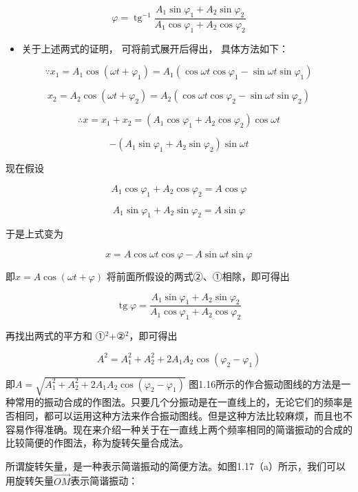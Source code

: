 \[
\varphi = \operatorname{tg} ^ {- 1} \frac {A _ {1} \sin \varphi_ {1} + A _ {2} \sin \varphi_ {2}}{A _ {1} \cos \varphi_ {1} + A _ {2} \cos \varphi_ {2}} \tag {1.27}
\]

\begin{itemize}
\tightlist
\item
  关于上述两式的证明， 可将前式展开后得出， 具体方法如下：
\end{itemize}

\[
\because x _ {1} = A _ {1} \cos (\omega t + \varphi_ {1}) = A _ {1} (\cos \omega t \cos \varphi_ {1} - \sin \omega t \sin \varphi_ {1})
\]

\[
x _ {2} = A _ {2} \cos (\omega t + \varphi_ {2}) = A _ {2} (\cos \omega t \cos \varphi_ {2} - \sin \omega t \sin \varphi_ {2})
\]

\[
\therefore x = x _ {1} + x _ {2} = (A _ {1} \cos \varphi_ {1} + A _ {2} \cos \varphi_ {2}) \cos \omega t
\]

\[
- \left(A _ {1} \sin \varphi_ {1} + A _ {2} \sin \varphi_ {2}\right) \sin \omega t
\]

现在假设

\[
A_1\cos\varphi_1+A_2\cos\varphi_2=A\cos\varphi
\]

\[
A_1\sin\varphi_1+A_2\sin\varphi_2=A\sin\varphi
\]

于是上式变为

\[
x = A \cos \omega t \cos \varphi - A \sin \omega t \sin \varphi
\]

即\(x = A\cos (\omega t + \varphi)\)
将前面所假设的两式②、①相除，即可得出

\[
\operatorname{tg} \varphi = \frac {A _ {1} \sin \varphi_ {1} + A _ {2} \sin \varphi_ {2}}{A _ {1} \cos \varphi_ {1} + A _ {2} \cos \varphi_ {2}}
\]

再找出两式的平方和 ①\(^{2}\)+②\(^{2}\)，即可得出

\[
A ^ {2} = A _ {1} ^ {2} + A _ {2} ^ {2} + 2 A _ {1} A _ {2} \cos (\varphi_ {2} - \varphi_ {1})
\]

即\(A = \sqrt{A_1^2 + A_2^2 + 2A_1A_2\cos(\varphi_2 - \varphi_1)}\)
图1.16所示的作合振动图线的方法是一种常用的振动合成的作图法。只要几个分振动是在一直线上的，无论它们的频率是否相同，都可以运用这种方法来作合振动图线。但是这种方法比较麻烦，而且也不容易作得准确。现在来介绍一种关于在一直线上两个频率相同的简谐振动的合成的比较简便的作图法，称为旋转矢量合成法。

所谓旋转矢量，是一种表示简谐振动的简便方法。如图1.17（a）所示，我们可以用旋转矢量\(\overrightarrow{OM}\)表示简谐振动：

